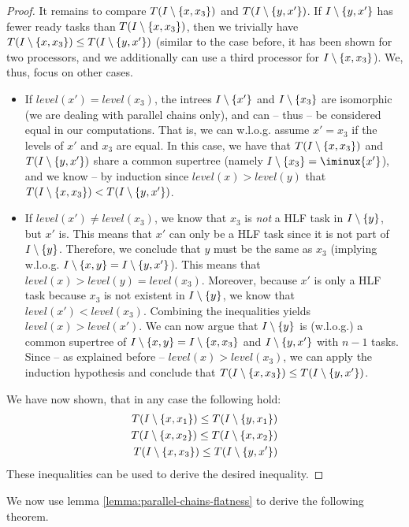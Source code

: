 \begin{proof}
  It remains to compare $T(I\setminus\{x, x_3\})$ and $T(I\setminus\{y, x'\})$. If $I\setminus\{y,x'\}$ has fewer ready tasks than $T(I\setminus\{x, x_3\})$, then we trivially have $T(I\setminus\{x, x_3\}) \leq T(I\setminus\{y, x'\})$ (similar to the case before, it has been shown for two processors, and we additionally can use a third processor for $I\setminus\{x,x_3\}$). We, thus, focus on other cases.

  \begin{itemize}
  \item  If $level(x')=level(x_3)$, the intrees $I\setminus\{x'\}$ and $I\setminus\{x_3\}$ are isomorphic (we are dealing with parallel chains only), and can -- thus -- be considered equal in our computations. That is, we can w.l.o.g. assume $x'=x_3$ if the levels of $x'$ and $x_3$ are equal. In this case, we have that $T(I\setminus\{x, x_3\})$ and $T(I\setminus\{y, x'\})$ share a common supertree (namely $\iminus{x_3}=\iminux{x'}$), and we know -- by induction since $level(x)>level(y)$ that $T(I\setminus\{x, x_3\}) < T(I\setminus\{y, x'\})$.
  \item   If $level(x') \neq level(x_3)$, we know that $x_3$ is \emph{not} a HLF task in $I\setminus\{y\}$, but $x'$ is. This means that $x'$ can only be a HLF task since it is not part of $I\setminus\{y\}$. Therefore, we conclude that $y$ must be the same as $x_3$ (implying w.l.o.g. $I\setminus\{x,y\}=I\setminus\{y,x'\}$). This means that $level(x)>level(y)=level(x_3)$. Moreover, because $x'$ is only a HLF task because $x_3$ is not existent in $I\setminus\{y\}$, we know that $level(x') < level(x_3)$. Combining the inequalities yields $level(x)>level(x')$. We can now argue that $I\setminus\{y\}$ is (w.l.o.g.) a common supertree of $I\setminus\{x,y\}=I\setminus\{x,x_3\}$ and $I\setminus\{y,x'\}$ with $n-1$ tasks. Since -- as explained before -- $level(x) > level(x_3)$, we can apply the induction hypothesis and conclude that $T(I\setminus\{x, x_3\}) \leq T(I\setminus\{y, x'\})$.
  \end{itemize}

  We have now shown, that in any case the following hold:
  \begin{eqnarray*} 
    T(I\setminus\{x, x_1\}) \leq T(I\setminus\{y, x_1\}) \\
    T(I\setminus\{x, x_2\}) \leq T(I\setminus\{x, x_2\}) \\
    T(I\setminus\{x, x_3\}) \leq T(I\setminus\{y, x'\})
  \end{eqnarray*}
  These inequalities can be used to derive the desired inequality.
\end{proof}

We now use lemma \ref{lemma:parallel-chains-flatness} to derive the following theorem.

